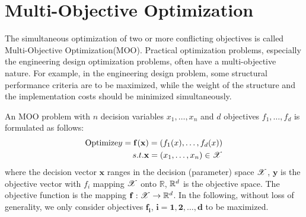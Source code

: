 \section{Multi-Objective Optimization}
\label{sec:MOMAB1}
The simultaneous optimization of two or more conflicting objectives is called Multi-Objective Optimization(MOO). Practical optimization problems, especially the engineering design optimization problems, often have a multi-objective nature. For example, in the engineering design problem, some structural performance criteria are to be maximized, while the weight of the structure and the implementation costs should be minimized simultaneously. 

An MOO problem with $n$ decision variables $x_1,\dots,x_n$ and $d$ objectives $f_1,\dots, f_d$ is formulated as follows:
\begin{equation}
\label{equa:moo}
\begin{split}
\text{Optimize} y=\mathbf{f(x)} =\left(f_1(x),\dots,f_d(x)\right) \\
s.t. \mathbf{x} = (x_1,\dots,x_n)\in \mathscr{X}
\end{split}
\end{equation}
where the decision vector $\mathbf{x}$ ranges in the decision (parameter) space $\mathscr{X}$, $\mathbf{y}$ is the objective vector with $f_i$ mapping $\mathscr{X}$ onto $\mathbb{R}$, $\mathbb{R}^d$ is the objective space. The objective function is the mapping $\mathbf{f} : \mathscr{X} \rightarrow \mathbb{R}^d$. In the following, without loss of generality, we only consider objectives $\mathbf{f_i}$, $\mathbf{i = 1,2,\dots,d}$ to be maximized.





